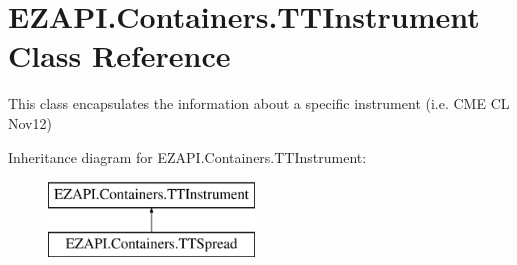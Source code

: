 \hypertarget{class_e_z_a_p_i_1_1_containers_1_1_t_t_instrument}{\section{E\-Z\-A\-P\-I.\-Containers.\-T\-T\-Instrument Class Reference}
\label{class_e_z_a_p_i_1_1_containers_1_1_t_t_instrument}
}


This class encapsulates the information about a specific instrument (i.\-e. C\-M\-E C\-L Nov12)  


Inheritance diagram for E\-Z\-A\-P\-I.\-Containers.\-T\-T\-Instrument\-:\begin{figure}[H]
\begin{center}
\leavevmode
\includegraphics[height=2.000000cm]{class_e_z_a_p_i_1_1_containers_1_1_t_t_instrument}
\end{center}
\end{figure}
